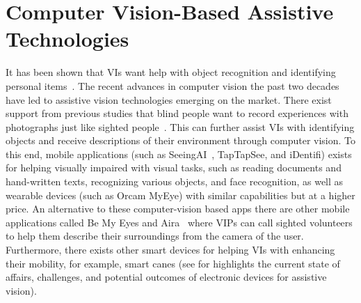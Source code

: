 



\section{Computer Vision-Based Assistive Technologies} %

It has been shown that VIs want help with object recognition and identifying personal items~\cite{brady2013visual}. 
The recent advances in computer vision the past two decades have led to assistive vision technologies emerging on the market. There exist support from previous studies that blind people want to record experiences with photographs just like sighted people~\cite{jayant2011supporting}. This can further assist VIs with identifying objects and receive descriptions of their environment through computer vision. To this end, mobile applications (such as SeeingAI~\cite{microsoft2017seeing}, TapTapSee, and iDentifi)  exists for helping visually impaired with visual tasks, such as reading documents and hand-written texts, recognizing various objects, and face recognition, as well as wearable devices (such as Orcam MyEye) with similar capabilities but at a higher price. An alternative to these computer-vision based apps there are other mobile applications called Be My Eyes and Aira~\cite{aira2017aira} where VIPs can call sighted volunteers to help them describe their surroundings from the camera of the user. Furthermore, there exists other smart devices for helping VIs with enhancing their mobility, for example, smart canes (see \cite{manduchi2012computer} for highlights the current state of affairs, challenges, and potential outcomes of electronic devices for assistive vision). 


